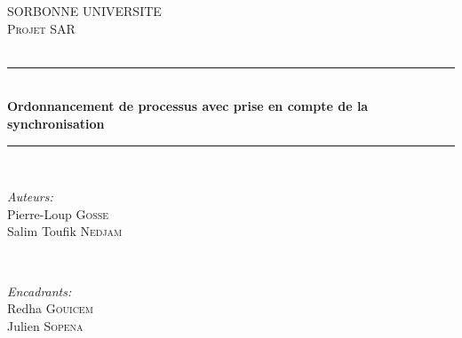 \begin{titlepage}

\newcommand{\HRule}{\rule{\linewidth}{0.5mm}} %

\center %


\textsc{\LARGE SORBONNE UNIVERSITE}\\[1.5cm] %
\textsc{\Large Projet SAR}\\[0.5cm] %
\textsc{\large }\\[0.5cm] %


\HRule \\[0.4cm]
{ \huge \bfseries Ordonnancement de processus avec prise en compte de la synchronisation}\\[0.4cm] %
\HRule \\[1.5cm]


\begin{minipage}{0.4\textwidth}
\begin{flushleft} \large
\emph{Auteurs:}\\
Pierre-Loup \textsc{Gosse}\\
Salim Toufik \textsc{Nedjam}
\end{flushleft}
\end{minipage}
~
\begin{minipage}{0.4\textwidth}
\begin{flushright} \large
\emph{Encadrants:} \\
Redha \textsc{Gouicem}\\
Julien \textsc{Sopena}
\end{flushright}
\end{minipage}\\[2cm]


\end{titlepage}
